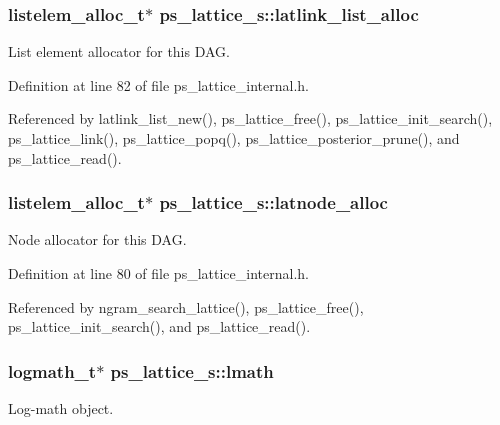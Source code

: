 \subsubsection[{latlink\-\_\-list\-\_\-alloc}]{\setlength{\rightskip}{0pt plus 5cm}listelem\-\_\-alloc\-\_\-t$\ast$ ps\-\_\-lattice\-\_\-s\-::latlink\-\_\-list\-\_\-alloc}\label{structps__lattice__s_a8e9cfaf92f9a3588d018578854c61e88}


List element allocator for this D\-A\-G. 



Definition at line 82 of file ps\-\_\-lattice\-\_\-internal.\-h.



Referenced by latlink\-\_\-list\-\_\-new(), ps\-\_\-lattice\-\_\-free(), ps\-\_\-lattice\-\_\-init\-\_\-search(), ps\-\_\-lattice\-\_\-link(), ps\-\_\-lattice\-\_\-popq(), ps\-\_\-lattice\-\_\-posterior\-\_\-prune(), and ps\-\_\-lattice\-\_\-read().

\subsubsection[{latnode\-\_\-alloc}]{\setlength{\rightskip}{0pt plus 5cm}listelem\-\_\-alloc\-\_\-t$\ast$ ps\-\_\-lattice\-\_\-s\-::latnode\-\_\-alloc}\label{structps__lattice__s_a14e4e87550647d5119cd1cc48ff4f3f1}


Node allocator for this D\-A\-G. 



Definition at line 80 of file ps\-\_\-lattice\-\_\-internal.\-h.



Referenced by ngram\-\_\-search\-\_\-lattice(), ps\-\_\-lattice\-\_\-free(), ps\-\_\-lattice\-\_\-init\-\_\-search(), and ps\-\_\-lattice\-\_\-read().

\subsubsection[{lmath}]{\setlength{\rightskip}{0pt plus 5cm}logmath\-\_\-t$\ast$ ps\-\_\-lattice\-\_\-s\-::lmath}\label{structps__lattice__s_a28f4ff5039e0961d57331d2605801010}


Log-\/math object. 




